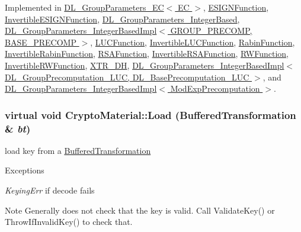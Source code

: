Implemented in \hyperlink{class_d_l___group_parameters___e_c_a8fa1181ce7cf91f12ba6de286d1da5bd}{DL\_\-GroupParameters\_\-EC$<$ EC $>$}, \hyperlink{class_e_s_i_g_n_function_a1ff8229ed7786a13a69d15e5a64e4d21}{ESIGNFunction}, \hyperlink{class_invertible_e_s_i_g_n_function_aca870e350b30d04a47d452f21e903278}{InvertibleESIGNFunction}, \hyperlink{class_d_l___group_parameters___integer_based_a151a76c88372bdf98c68be2ad19400e1}{DL\_\-GroupParameters\_\-IntegerBased}, \hyperlink{class_d_l___group_parameters___integer_based_impl_a0d668d2148cf57078a93f3a5a4b4ac2a}{DL\_\-GroupParameters\_\-IntegerBasedImpl$<$ GROUP\_\-PRECOMP, BASE\_\-PRECOMP $>$}, \hyperlink{class_l_u_c_function_af6a95ed660e53a5fa07841f139d43ccf}{LUCFunction}, \hyperlink{class_invertible_l_u_c_function_aaaef1b335de1f76ec61079d1dfd78744}{InvertibleLUCFunction}, \hyperlink{class_rabin_function_ae585a0d58b1b95579459c2b42eea980c}{RabinFunction}, \hyperlink{class_invertible_rabin_function_a66594bb7f369e4ecc30bbe6ae62527ea}{InvertibleRabinFunction}, \hyperlink{class_r_s_a_function_ad2db62b20297a8d9df55171e73fe8de7}{RSAFunction}, \hyperlink{class_invertible_r_s_a_function_a871fc366191e9c5fae114c06a200c928}{InvertibleRSAFunction}, \hyperlink{class_r_w_function_a99293c55c055b338bd7c783a7b8c0484}{RWFunction}, \hyperlink{class_invertible_r_w_function_a56b0314b678c58228671d3c9049f86db}{InvertibleRWFunction}, \hyperlink{class_x_t_r___d_h_af2456cb49f5b36edaaef3c0cae25a775}{XTR\_\-DH}, \hyperlink{class_d_l___group_parameters___integer_based_impl_a0d668d2148cf57078a93f3a5a4b4ac2a}{DL\_\-GroupParameters\_\-IntegerBasedImpl$<$ DL\_\-GroupPrecomputation\_\-LUC, DL\_\-BasePrecomputation\_\-LUC $>$}, and \hyperlink{class_d_l___group_parameters___integer_based_impl_a0d668d2148cf57078a93f3a5a4b4ac2a}{DL\_\-GroupParameters\_\-IntegerBasedImpl$<$ ModExpPrecomputation $>$}.\hypertarget{class_crypto_material_ae7a94de4c3d3822070db5babbdf8b113}{
\subsubsection[{Load}]{\setlength{\rightskip}{0pt plus 5cm}virtual void CryptoMaterial::Load ({\bf BufferedTransformation} \& {\em bt})}}
\label{class_crypto_material_ae7a94de4c3d3822070db5babbdf8b113}


load key from a \hyperlink{class_buffered_transformation}{BufferedTransformation} 
\begin{DoxyExceptions}{Exceptions}
\item[{\em KeyingErr}]if decode fails \end{DoxyExceptions}
\begin{DoxyNote}{Note}
Generally does not check that the key is valid. Call ValidateKey() or ThrowIfInvalidKey() to check that. 
\end{DoxyNote}


